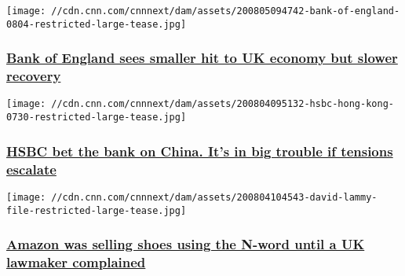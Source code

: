 \href{/2020/08/06/economy/bank-of-england-uk-economy/index.html}{}

\texttt{[image: //cdn.cnn.com/cnnnext/dam/assets/200805094742-bank-of-england-0804-restricted-large-tease.jpg]}

\hypertarget{bank-of-england-sees-smaller-hit-to-uk-economy-but-slower-recovery-1}{%
\subsubsection{\texorpdfstring{\href{/2020/08/06/economy/bank-of-england-uk-economy/index.html}{Bank
of England sees smaller hit to UK economy but slower
recovery}}{Bank of England sees smaller hit to UK economy but slower recovery}}\label{bank-of-england-sees-smaller-hit-to-uk-economy-but-slower-recovery-1}}

\href{/2020/08/05/business/hsbc-china-challenges-intl-hnk/index.html}{}

\texttt{[image: //cdn.cnn.com/cnnnext/dam/assets/200804095132-hsbc-hong-kong-0730-restricted-large-tease.jpg]}

\hypertarget{hsbc-bet-the-bank-on-china-its-in-big-trouble-if-tensions-escalate}{%
\subsubsection{\texorpdfstring{\href{/2020/08/05/business/hsbc-china-challenges-intl-hnk/index.html}{HSBC
bet the bank on China. It's in big trouble if tensions
escalate}}{HSBC bet the bank on China. It's in big trouble if tensions escalate}}\label{hsbc-bet-the-bank-on-china-its-in-big-trouble-if-tensions-escalate}}

\href{/2020/08/04/business/david-lammy-amazon-shoes-scli-intl-gbr/index.html}{}

\texttt{[image: //cdn.cnn.com/cnnnext/dam/assets/200804104543-david-lammy-file-restricted-large-tease.jpg]}

\hypertarget{amazon-was-selling-shoes-using-the-n-word-until-a-uk-lawmaker-complained-}{%
\subsubsection{\texorpdfstring{\href{/2020/08/04/business/david-lammy-amazon-shoes-scli-intl-gbr/index.html}{Amazon
was selling shoes using the N-word until a UK lawmaker complained
}}{Amazon was selling shoes using the N-word until a UK lawmaker complained }}\label{amazon-was-selling-shoes-using-the-n-word-until-a-uk-lawmaker-complained-}}

